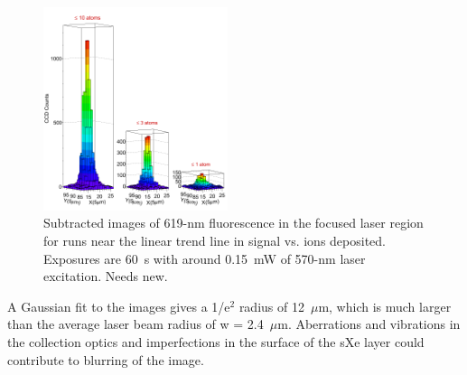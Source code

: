 \documentclass[aps,pra,reprint,superscriptaddress]{revtex4-1}
\begin{document}


\begin{figure}
\includegraphics[width=0.48\textwidth]{figures/lego_train_fromthesis.png}
\caption{Subtracted images of 619-nm fluorescence in the focused laser region for runs near the linear trend line in signal vs. ions deposited.  Exposures are 60~s with around 0.15~mW of 570-nm laser excitation. {\color{gray}Needs new.}}
\label{fig:train}
\end{figure}


A Gaussian fit to the images gives a 1/e$^{2}$ radius of 12~$\mu$m, which is much larger than the average laser beam radius of w = 2.4~$\mu$m.  Aberrations and vibrations in the collection optics and imperfections in the surface of the sXe layer could contribute to blurring of the image.
\end{document}
